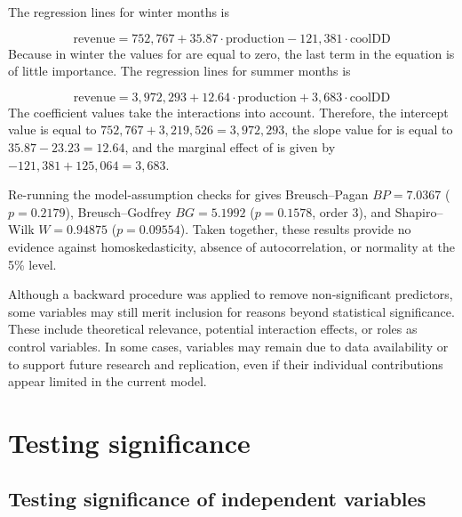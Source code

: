 The regression lines for winter months is

\begin{equation*}
  \text{revenue} = 752,767 + 35.87 \cdot \text{production} - 121,381 \cdot \text{coolDD} 
\end{equation*}
Because in winter the values for  are equal to zero, the last term in the equation is of little importance.
The regression lines for summer months is

\begin{equation*}
  \text{revenue} = 3,972,293 + 12.64 \cdot \text{production} + 3,683 \cdot \text{coolDD}
\end{equation*}
The coefficient values take the interactions into account. Therefore, the intercept value is equal to $752,767 + 3,219,526 = 3,972,293$, the slope value for  is equal to $35.87 - 23.23 = 12.64$, and the marginal effect of  is given by $-121,381 + 125,064 = 3,683$.

Re-running the model-assumption checks for  gives Breusch--Pagan $BP = 7.0367$ ($p = 0.2179$), Breusch--Godfrey $BG = 5.1992$ ($p = 0.1578$, order 3), and Shapiro--Wilk $W = 0.94875$ ($p = 0.09554$). Taken together, these results provide no evidence against homoskedasticity, absence of autocorrelation, or normality at the 5\% level.

Although a backward procedure was applied to remove non-significant predictors, some variables may still merit inclusion for reasons beyond statistical significance. 
These include theoretical relevance, potential interaction effects, or roles as control variables. 
In some cases, variables may remain due to data availability or to support future research and replication, even if their individual contributions appear limited in the current model.


\section{Testing significance} %
\label{sec:testing_significance}

\subsection{Testing significance of independent variables} %
\label{sub:testing_significance_of_independent_variables}

